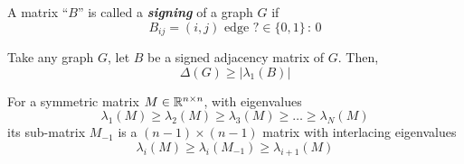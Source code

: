 \begin{definition}
	A matrix ``$B$'' is called a \textit{\textbf{signing}} of a graph $G$ if 
	\begin{equation}
		B_{ij} = (i, j) \text{ edge } ? \in \{0 , 1\} \, : \, 0
	\end{equation}
\end{definition}

\begin{proposition} 
	[Observation 2]
	Take any graph $G$, let $B$ be a signed adjacency matrix of $G$. Then, 
	\begin{equation}
		\Delta (G) \geq |\lambda_1 (B) |
	\end{equation}	
\end{proposition}

\begin{theorem}
	For a symmetric matrix $M \in \mathbb{R}^{n \times n}$, with eigenvalues
	\begin{equation}
		\lambda_1(M) \geq \lambda_2(M) \geq \lambda_3(M) \geq \dots \geq \lambda_N(M)
	\end{equation}
	its sub-matrix $M_{-1}$ is a $(n - 1) \times (n - 1)$ matrix with interlacing eigenvalues
	\begin{equation}
		\lambda_i(M) \geq \lambda_i (M_{-1}) \geq \lambda_{i + 1} (M)
	\end{equation}
\end{theorem}













